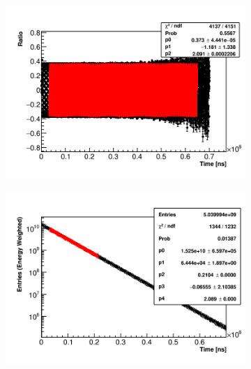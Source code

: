 \begin{figure}[]
    \begin{subfigure}[t]{0.45\textwidth}
        \centering
        \includegraphics[width=\textwidth]{Example_RMethod_Fit}
        \caption{}
    \end{subfigure}
    \hspace{1mm}
    \begin{subfigure}[t]{0.45\textwidth}
        \centering
        \includegraphics[width=\textwidth]{Example_QMethod_Fit}
        \caption{}
    \end{subfigure}
\caption[]{}
\label{fig:}
\end{figure}


